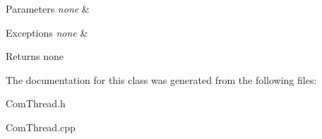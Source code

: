 \begin{DoxyParams}{Parameters}
{\em none} & \\
\hline
\end{DoxyParams}

\begin{DoxyExceptions}{Exceptions}
{\em none} & \\
\hline
\end{DoxyExceptions}
\begin{DoxyReturn}{Returns}
none 
\end{DoxyReturn}


The documentation for this class was generated from the following files\-:\begin{DoxyCompactItemize}
\item 
Com\-Thread.\-h\item 
Com\-Thread.\-cpp\end{DoxyCompactItemize}
